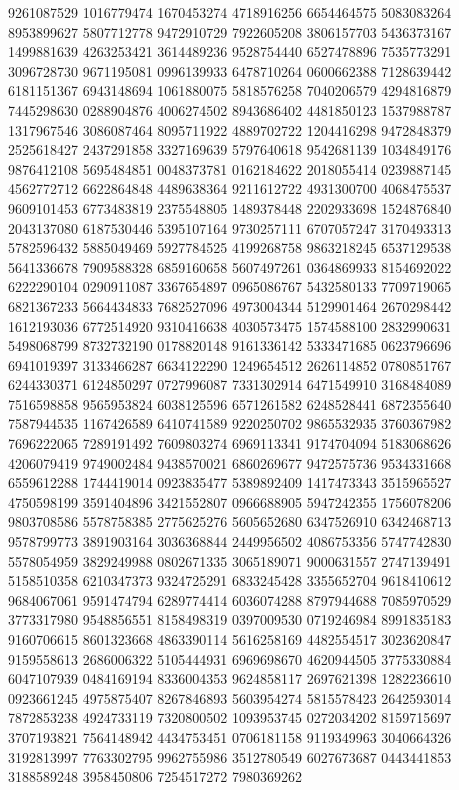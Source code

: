 {{9261087529 1016779474 1670453274 4718916256 6654464575 5083083264 8953899627
5807712778 9472910729 7922605208 3806157703 5436373167 1499881639 4263253421
3614489236 9528754440 6527478896 7535773291 3096728730 9671195081 0996139933
6478710264 0600662388 7128639442 6181151367 6943148694 1061880075 5818576258
7040206579 4294816879 7445298630 0288904876 4006274502 8943686402 4481850123
1537988787 1317967546 3086087464 8095711922 4889702722 1204416298 9472848379
2525618427 2437291858 3327169639 5797640618 9542681139 1034849176 9876412108
5695484851 0048373781 0162184622 2018055414 0239887145 4562772712 6622864848
4489638364 9211612722 4931300700 4068475537 9609101453 6773483819 2375548805
1489378448 2202933698 1524876840 2043137080 6187530446 5395107164 9730257111
6707057247 3170493313 5782596432 5885049469 5927784525 4199268758 9863218245
6537129538 5641336678 7909588328 6859160658 5607497261 0364869933 8154692022
6222290104 0290911087 3367654897 0965086767 5432580133 7709719065 6821367233
5664434833 7682527096 4973004344 5129901464 2670298442 1612193036 6772514920
9310416638 4030573475 1574588100 2832990631 5498068799 8732732190 0178820148
9161336142 5333471685 0623796696 6941019397 3133466287 6634122290 1249654512
2626114852 0780851767 6244330371 6124850297 0727996087 7331302914 6471549910
3168484089 7516598858 9565953824 6038125596 6571261582 6248528441 6872355640
7587944535 1167426589 6410741589 9220250702 9865532935 3760367982 7696222065
7289191492 7609803274 6969113341 9174704094 5183068626 4206079419 9749002484
9438570021 6860269677 9472575736 9534331668 6559612288 1744419014 0923835477
5389892409 1417473343 3515965527 4750598199 3591404896 3421552807 0966688905
5947242355 1756078206 9803708586 5578758385 2775625276 5605652680 6347526910
6342468713 9578799773 3891903164 3036368844 2449956502 4086753356 5747742830
5578054959 3829249988 0802671335 3065189071 9000631557 2747139491 5158510358
6210347373 9324725291 6833245428 3355652704 9618410612 9684067061 9591474794
6289774414 6036074288 8797944688 7085970529 3773317980 9548856551 8158498319
0397009530 0719246984 8991835183 9160706615 8601323668 4863390114 5616258169
4482554517 3023620847 9159558613 2686006322 5105444931 6969698670 4620944505
3775330884 6047107939 0484169194 8336004353 9624858117 2697621398 1282236610
0923661245 4975875407 8267846893 5603954274 5815578423 2642593014 7872853238
4924733119 7320800502 1093953745 0272034202 8159715697 3707193821 7564148942
4434753451 0706181158 9119349963 3040664326 3192813997 7763302795 9962755986
3512780549 6027673687 0443441853 3188589248 3958450806 7254517272 7980369262
}}
